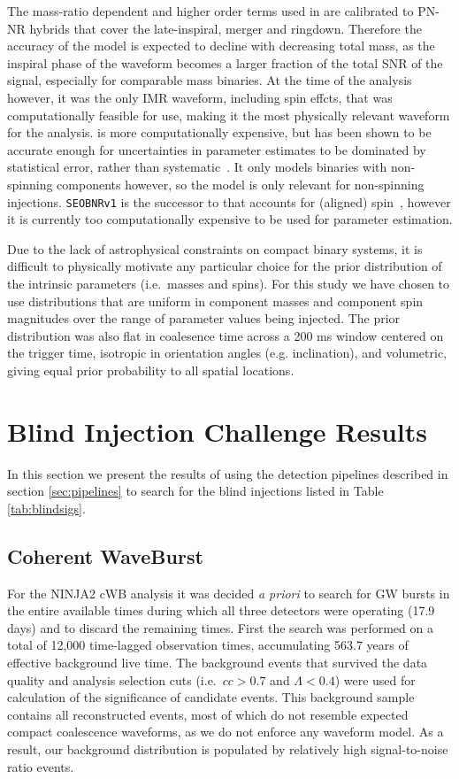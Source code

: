 The mass-ratio dependent and higher order terms used in \imr are calibrated to 
PN-NR hybrids
that cover the late-inspiral, merger and ringdown. Therefore the accuracy of the
model is expected to decline with decreasing total mass, as the inspiral phase
of the waveform becomes a larger fraction of the total SNR of the signal,
especially for comparable mass binaries. At the time of the analysis however, 
it was the only IMR waveform, including spin effcts, that was computationally
feasible for use, making it the most physically relevant waveform for the 
analysis. \eob is more computationally expensive, but has been
shown to be accurate enough for uncertainties in parameter estimates to be
dominated by statistical error, rather than
systematic~\cite{Littenberg:2012uj}.  It only models binaries with non-spinning
components however, so the model is only relevant for non-spinning injections.
\texttt{SEOBNRv1} is the successor to \eob that accounts for
(aligned) spin~\cite{Taracchini:2012ig}, however it is currently too 
computationally expensive to be used for parameter estimation.

Due to the lack of astrophysical constraints on compact binary systems, it is
difficult to physically motivate any particular choice for the prior 
distribution of the intrinsic parameters (i.e.\ masses and spins).  For this 
study we have
chosen to use distributions that are uniform in component masses and component 
spin magnitudes over the range of parameter values being injected.  The prior
distribution was also flat in coalesence time across a 200 ms window centered
on the trigger time, isotropic in orientation angles (e.g. inclination), and
volumetric, giving equal prior probability to all spatial locations.

\section{Blind Injection Challenge Results}
\label{sec:searches}

In this section we present the results of using the detection pipelines 
described in section \ref{sec:pipelines} to search for the blind injections 
listed 
in Table \ref{tab:blindsigs}.

\subsection{Coherent WaveBurst}

For the NINJA2 cWB analysis 
it was decided \textit{a priori}
to search for GW bursts in the entire available 
times during which all three detectors were operating
(17.9 days) and to discard the remaining times.
First the search was performed on a total of 
12,000 time-lagged observation times, accumulating 563.7 years of effective 
background live time. The background events that survived the data quality and 
analysis selection cuts (i.e.\ ${cc}>0.7$ and ${\Lambda}<0.4$) 
were used for calculation of the significance of candidate events. This 
background sample contains all reconstructed events, most of which do 
not resemble expected compact coalescence waveforms, as we do not 
enforce any waveform model. As a result, our background distribution is 
populated by relatively high signal-to-noise ratio events.   

